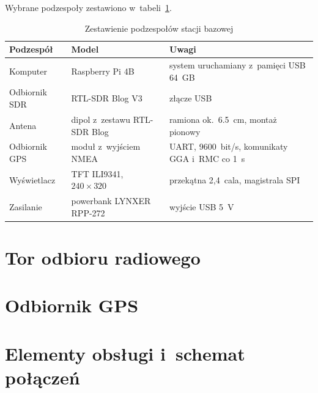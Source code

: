 Wybrane podzespoły zestawiono w~tabeli~\ref{tab:podzespoly}.

\begin{table}[H]
  \centering
  \caption{Zestawienie podzespołów stacji bazowej}
  \label{tab:podzespoly}
  \small
  \begin{tabular}{l l >{\raggedright\arraybackslash}p{5.5cm}}
    \toprule
    Podzespół & Model & Uwagi \\
    \midrule
    Komputer        & Raspberry Pi 4B          & system uruchamiany z~pamięci USB \SI{64}{GB} \\
    Odbiornik SDR   & RTL-SDR Blog V3          & złącze USB \\
    Antena          & dipol z~zestawu RTL-SDR Blog & ramiona ok.\ \SI{6.5}{cm}, montaż pionowy \\
    Odbiornik GPS   & moduł z~wyjściem NMEA    & UART, \SI{9600}{bit/s}, komunikaty GGA i~RMC co \SI{1}{s} \\
    Wyświetlacz     & TFT ILI9341, $240\times320$ & przekątna 2,4~cala, magistrala SPI \\
    Zasilanie       & powerbank LYNXER RPP-272 & wyjście USB \SI{5}{V} \\
    \bottomrule
  \end{tabular}
\end{table}

\section{Tor odbioru radiowego}
\label{sec:tor_radiowy}

\section{Odbiornik GPS}
\label{sec:odbiornik_gps}

\section{Elementy obsługi i~schemat połączeń}
\label{sec:polaczenia}

